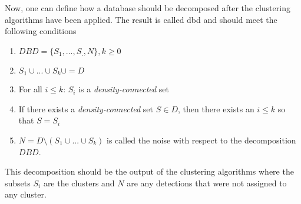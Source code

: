 Now, one can define how a database should be decomposed after the clustering algorithms have been applied. The result is called \ac{dbd} and should meet the following conditions 

\begin{enumerate}
	\item $DBD = \{S_1,...,S_.,N\},k \geq 0$
	\item $S_1\cup ... \cup S_k \cup = D$
	\item For all $i \leq k$: $S_i$ is a \textit{density-connected} set
	\item  If there exists a \textit{density-connected} set $S\in D$, then there exists an $i \leq k$ so that $S =S_i$ 
	\item $N = D\setminus (S_1\cup...\cup S_k) $ is called the noise with respect to the decomposition $DBD$.
\end{enumerate}

This decomposition should be the output of the clustering algorithms where the subsets $S_i$ are the clusters and $N$ are any detections that were not assigned to any cluster. 